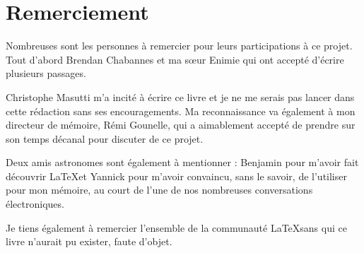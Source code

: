 \section*{Remerciement}

Nombreuses sont les personnes à remercier pour leurs participations à ce projet. Tout d'abord Brendan Chabannes et ma sœur Enimie qui ont accepté d'écrire plusieurs passages.

Christophe Masutti m'a incité à écrire ce livre et je ne me serais pas lancer dans cette rédaction sans ses encouragements. Ma reconnaissance va également à mon directeur de mémoire, Rémi Gounelle, qui a aimablement accepté de prendre sur son temps décanal pour discuter de ce projet.

Deux amis astronomes sont également à mentionner : Benjamin pour m'avoir fait découvrir  \LaTeX et Yannick pour m'avoir convaincu, sans le savoir, de l'utiliser pour mon mémoire, au court de l'une de nos nombreuses conversations électroniques.

Je tiens également à remercier l'ensemble de la communauté \LaTeX sans qui ce livre n'aurait pu exister, faute d'objet.
 

